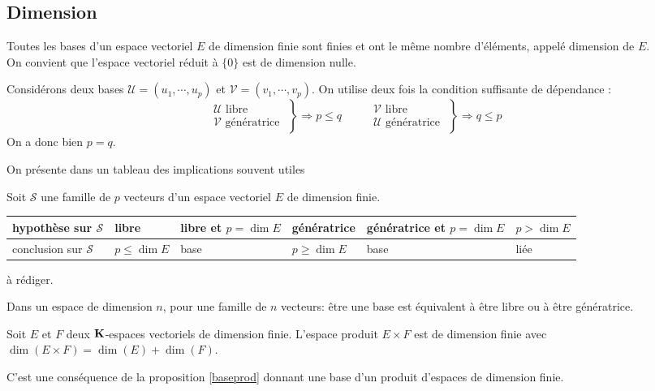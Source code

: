 \subsection{Dimension}
\begin{propdef}
Toutes les bases d'un espace vectoriel $E$ de dimension finie sont finies et ont le m\^eme nombre d'\'el\'ements, appel\'e dimension de $E$.\\ On convient que l'espace vectoriel r\'eduit \`a  $\{0\}$ est de dimension nulle.
\end{propdef}
\begin{demo}
 Considérons deux bases $\mathcal U=(u_1,\cdots,u_p)$ et $\mathcal V=(v_1,\cdots,v_p)$. On utilise deux fois la condition suffisante de dépendance :
\begin{displaymath}
 \left. 
\begin{aligned}
 \mathcal{U}\text{ libre }\\
 \mathcal{V}\text{ génératrice }
\end{aligned}
\right\rbrace 
\Rightarrow p\leq q
\hspace{1cm}
 \left. 
\begin{aligned}
 \mathcal{V}\text{ libre }\\
 \mathcal{U}\text{ génératrice }
\end{aligned}
\right\rbrace 
\Rightarrow q\leq p
\end{displaymath}
On a donc bien $p=q$.
\end{demo}
On présente dans un tableau des implications souvent utiles 
\begin{propn} \label{propfamdim}
Soit $\mathcal{S}$ une famille de $p$ vecteurs d'un espace vectoriel $E$ de dimension finie.
\begin{center} \renewcommand{\arraystretch}{1.6}
\begin{tabular}{|l|l|l|l|l|l|} \hline
hypothèse sur $\mathcal{S}$ & libre           & libre et $p=\dim E$ & génératrice    & génératrice et $p=\dim E$ & $p > \dim E$ \\ \hline
conclusion sur $\mathcal{S}$& $p \leq \dim E$ &  base               & $p\geq \dim E$ & base                      & liée \\ \hline
\end{tabular}
\end{center}
\end{propn}
\begin{demo}
 à rédiger.
\end{demo}
\begin{rem}
  Dans un espace de dimension $n$, pour une famille de $n$ vecteurs: être une base est équivalent à être libre ou à être génératrice.
\end{rem}
\begin{propn}
 Soit $E$ et $F$ deux $\mathbf{K}$-espaces vectoriels de dimension finie. L'espace produit $E\times F$ est de dimension finie avec $\dim(E \times F) = \dim(E) + \dim(F)$.
\end{propn}
\begin{demo}
 C'est une conséquence de la proposition \ref{baseprod} donnant une base d'un produit d'espaces de dimension finie.
\end{demo}


